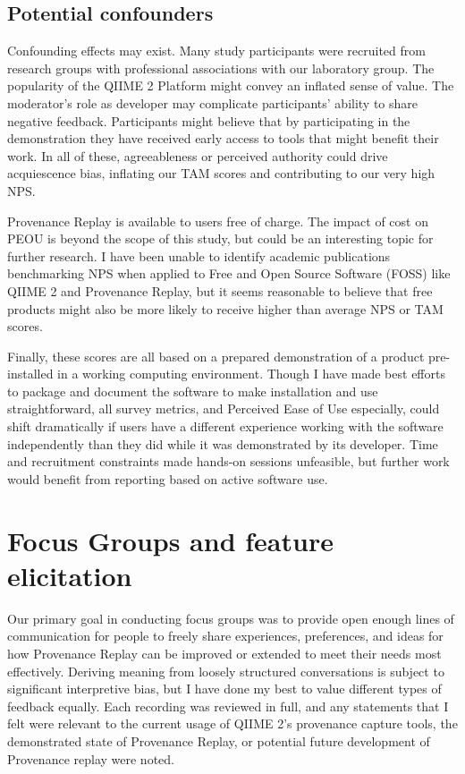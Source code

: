 \subsection{Potential confounders}

Confounding effects may exist. Many study participants were recruited from
research groups with professional associations with our laboratory group. The
popularity of the QIIME 2 Platform might convey an inflated sense of value. The
moderator’s role as developer may complicate participants’ ability to share
negative feedback. Participants might believe that by participating in the
demonstration they have received early access to tools that might benefit their
work. In all of these, agreeableness or perceived authority could drive
acquiescence bias, inflating our TAM scores and contributing to our very high
NPS.

Provenance Replay is available to users free of charge. The impact of cost on
PEOU is beyond the scope of this study, but could be an interesting topic for
further research. I have been unable to identify academic publications
benchmarking NPS when applied to Free and Open Source Software (FOSS) like QIIME
2 and Provenance Replay, but it seems reasonable to believe that free products
might also be more likely to receive higher than average NPS or TAM scores.

Finally, these scores are all based on a prepared demonstration of a product
pre-installed in a working computing environment. Though I have made best
efforts to package and document the software to make installation and use
straightforward, all survey metrics, and Perceived Ease of Use especially, could
shift dramatically if users have a different experience working with the
software independently than they did while it was demonstrated by its developer.
Time and recruitment constraints made hands-on sessions unfeasible, but further
work would benefit from reporting based on active software use.


\section{Focus Groups and feature elicitation}

Our primary goal in conducting focus groups was to provide open enough lines of
communication for people to freely share experiences, preferences, and ideas for
how Provenance Replay can be improved or extended to meet their needs most
effectively. Deriving meaning from loosely structured conversations is subject
to significant interpretive bias, but I have done my best to value different
types of feedback equally. Each recording was reviewed in full, and any
statements that I felt were relevant to the current usage of QIIME 2’s
provenance capture tools, the demonstrated state of Provenance Replay, or
potential future development of Provenance replay were noted. 


